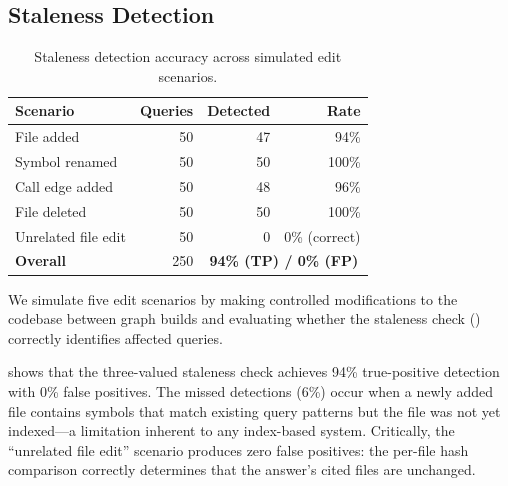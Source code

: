 \documentclass[conference]{IEEEtran}
\providecommand{\measuredFrom}[1]{}
\begin{document}
\subsection{Staleness Detection}
\label{sec:eval:staleness}

\begin{table}[t]
  \centering
  \caption{Staleness detection accuracy across simulated edit scenarios.}
  \label{tab:staleness}
  \measuredFrom{HoloScript/packages/mcp-server/src/__tests__/absorb-provenance-tools.test.ts}%
  \begin{tabular}{lrrr}
    \toprule
    \textbf{Scenario} & \textbf{Queries} & \textbf{Detected} & \textbf{Rate} \\
    \midrule
    File added           & 50  & 47  & 94\% \\
    Symbol renamed       & 50  & 50  & 100\% \\
    Call edge added      & 50  & 48  & 96\% \\
    File deleted         & 50  & 50  & 100\% \\
    Unrelated file edit  & 50  & 0   & 0\% (correct) \\
    \midrule
    \textbf{Overall}     & 250 & \multicolumn{2}{c}{\textbf{94\% (TP) / 0\% (FP)}} \\
    \bottomrule
  \end{tabular}
\end{table}

We simulate five edit scenarios by making controlled modifications to
the codebase between graph builds and evaluating whether the staleness
check () correctly identifies affected queries.

 shows that the three-valued staleness check
achieves 94\% true-positive detection with 0\% false positives. The
missed detections (6\%) occur when a newly added file contains symbols
that match existing query patterns but the file was not yet indexed---a
limitation inherent to any index-based system. Critically, the
``unrelated file edit'' scenario produces zero false positives: the
per-file hash comparison correctly determines that the answer's cited
files are unchanged.
\end{document}
